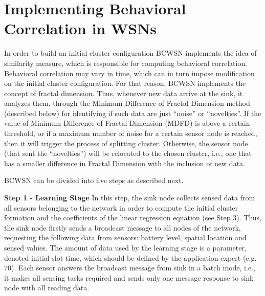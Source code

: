 \documentclass{acm_proc_article-sp}
\begin{document}
\section{Implementing Behavioral Correlation in WSNs}
\label{implementing-bcwsn}

In order to build an initial cluster configuration BCWSN implements the idea of
similarity measure, which is responsible for computing behavioral correlation.
Behavioral correlation may vary in time, which can in turn impose modification
on the initial cluster configuration. For that reason, BCWSN implements the
concept of fractal dimension. Thus, whenever new data arrive at the sink, it
analyzes them, through the Minimum Difference of Fractal Dimension method
(described below) for identifying if such data are just ``noise'' or
``novelties''. If the value of Minimum Difference of Fractal Dimension (MDFD) is
above a certain threshold, or if a maximum number of noise for a certain sensor
node is reached, then it will trigger the process of splitting cluster.
Otherwise, the sensor node (that sent the ``novelties'') will be relocated to
the chosen cluster, i.e., one that has a smaller difference in Fractal Dimension
with the inclusion of new data.
\vspace*{-.3cm}



BCWSN can be divided into five steps as described next.
\vspace*{-.3cm}

{\bf Step 1 - Learning Stage}
In this step, the sink node collects sensed data from all sensors belonging to
the network in order to compute the initial cluster formation and the
coefficients of the linear regression equation (see Step 3). Thus, the sink 
node firstly sends a broadcast message to all
nodes of the network, requesting the following data from sensors:
battery level, spatial location and sensed values. The amount of data used by the
learning stage is a parameter, denoted initial slot time, which should be
defined by the application expert (e.g. 70). Each sensor answers the broadcast
message from sink in a batch mode, i.e., it makes all sensing tasks required and
sends only one message response to sink node with all reading data.
\vspace*{-.3cm}
\end{document}
